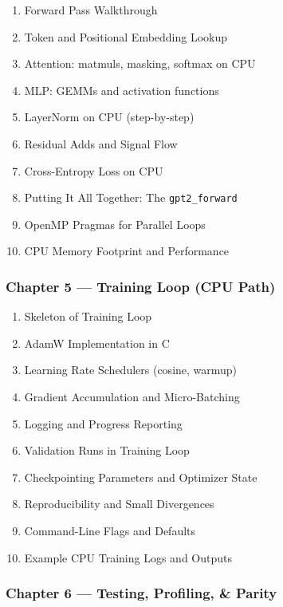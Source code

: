 \documentclass[
  letterpaper,
  DIV=11,
  numbers=noendperiod]{scrreprt}
\providecommand{\tightlist}{%
  \setlength{\itemsep}{0pt}\setlength{\parskip}{0pt}}
\begin{document}
\begin{enumerate}
\def\labelenumi{\arabic{enumi}.}
\setcounter{enumi}{30}
\tightlist
\item
  Forward Pass Walkthrough
\item
  Token and Positional Embedding Lookup
\item
  Attention: matmuls, masking, softmax on CPU
\item
  MLP: GEMMs and activation functions
\item
  LayerNorm on CPU (step-by-step)
\item
  Residual Adds and Signal Flow
\item
  Cross-Entropy Loss on CPU
\item
  Putting It All Together: The \texttt{gpt2\_forward}
\item
  OpenMP Pragmas for Parallel Loops
\item
  CPU Memory Footprint and Performance
\end{enumerate}

\subsubsection{Chapter 5 --- Training Loop (CPU
Path)}\label{chapter-5-training-loop-cpu-path}

\begin{enumerate}
\def\labelenumi{\arabic{enumi}.}
\setcounter{enumi}{40}
\tightlist
\item
  Skeleton of Training Loop
\item
  AdamW Implementation in C
\item
  Learning Rate Schedulers (cosine, warmup)
\item
  Gradient Accumulation and Micro-Batching
\item
  Logging and Progress Reporting
\item
  Validation Runs in Training Loop
\item
  Checkpointing Parameters and Optimizer State
\item
  Reproducibility and Small Divergences
\item
  Command-Line Flags and Defaults
\item
  Example CPU Training Logs and Outputs
\end{enumerate}

\subsubsection{Chapter 6 --- Testing, Profiling, \&
Parity}\label{chapter-6-testing-profiling-parity}
\end{document}

